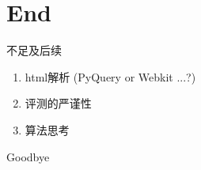 \documentclass{beamer}
\begin{document}
\section{End}
\begin{frame}{不足及后续}
    \begin{enumerate}
    \item html解析 (PyQuery or Webkit ...?)
    \item 评测的严谨性
    \item 算法思考
    \end{enumerate}
\end{frame}
\begin{frame}{Goodbye}
    \begin{center}
    \end{center}
\end{frame}
\end{document}
